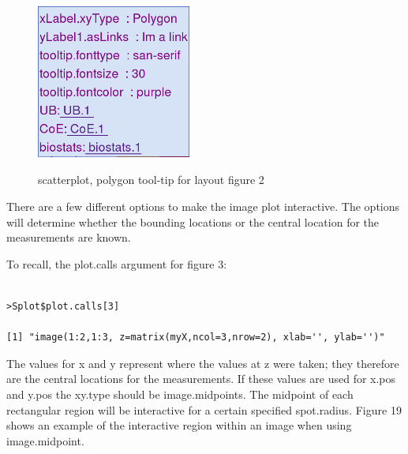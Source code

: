 \documentclass[]{article}
\begin{document}
\begin{center}
\begin{figure}
\includegraphics[width=2in, height=2.3in]{tip6}
\caption{scatterplot, polygon tool-tip for layout figure 2}
\end{figure}
\end{center}



\vspace{5mm}

\large {} 

\vspace{5mm}

\normalsize

There are a few different options to make the image plot interactive. The options will determine whether the bounding locations or the central location for the measurements are known.  

To recall, the plot.calls argument for figure 3:

\begin{verbatim}

>Splot$plot.calls[3]

[1] "image(1:2,1:3, z=matrix(myX,ncol=3,nrow=2), xlab='', ylab='')"

\end{verbatim}

The values for x and y represent where the values at z were taken; they therefore are the central locations for the measurements. If these values are used for x.pos and y.pos the xy.type should be image.midpoints. The midpoint of each rectangular region will be interactive for a certain specified spot.radius. Figure 19 shows an example of the interactive region within an image when using image.midpoint. 
\end{document}
